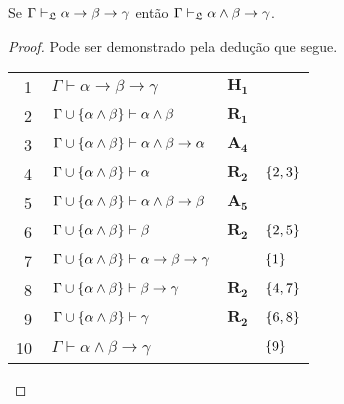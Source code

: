 \vspace{.5\baselineskip}
\begin{tcolorbox}[enhanced jigsaw, breakable, sharp corners, colframe=black, colback=white, boxrule=0.5pt, left=1.5mm, right=1.5mm, top=1.5mm, bottom=1.5mm]
    \begin{lemma}[Importação]\label{importation}
        Se $\Gamma\mathrel{\vdash}_\mathfrak{L}\alpha\to\beta\to\gamma$ então $\Gamma\mathrel{\vdash}_\mathfrak{L}\alpha\wedge\beta\to\gamma$.
        \begin{proof}
        Pode ser demonstrado pela dedução que segue.

        \vspace{0.5\baselineskip}
        \footnotesize
        \setlength{\rowskip}{0.5\baselineskip}
        \begin{xltabular}{\textwidth}{r | X l l}
            \scriptsize{\phantom{0}1}\phantom{ } & $\ \Gamma\vdash\alpha\to\beta\to\gamma$                               & $\mathbf{H_1}$\phantom{1}                & \\[\rowskip]
            \scriptsize{\phantom{0}2}\phantom{ } & $\ \Gamma\cup\set{\alpha\wedge\beta}\vdash\alpha\wedge\beta$          & $\hyperref[modal.rule.1]{\mathbf{R_1}}$  & \\[\rowskip]
            \scriptsize{\phantom{0}3}\phantom{ } & $\ \Gamma\cup\set{\alpha\wedge\beta}\vdash\alpha\wedge\beta\to\alpha$ & $\hyperref[modal.axiom.4]{\mathbf{A_4}}$ & \\[\rowskip]
            \scriptsize{\phantom{0}4}\phantom{ } & $\ \Gamma\cup\set{\alpha\wedge\beta}\vdash\alpha$                     & $\hyperref[modal.rule.2]{\mathbf{R_2}}$  & $\left\{2,3\right\}$\\[\rowskip]
            \scriptsize{\phantom{0}5}\phantom{ } & $\ \Gamma\cup\set{\alpha\wedge\beta}\vdash\alpha\wedge\beta\to\beta$  & $\hyperref[modal.axiom.5]{\mathbf{A_5}}$ & \\[\rowskip]
            \scriptsize{\phantom{0}6}\phantom{ } & $\ \Gamma\cup\set{\alpha\wedge\beta}\vdash\beta$                      & $\hyperref[modal.rule.2]{\mathbf{R_2}}$  & $\left\{2,5\right\}$\\[\rowskip]
            \scriptsize{\phantom{0}7}\phantom{ } & $\ \Gamma\cup\set{\alpha\wedge\beta}\vdash\alpha\to\beta\to\gamma$    &                      & $\left\{1\right\}$\\[\rowskip]
            \scriptsize{\phantom{0}8}\phantom{ } & $\ \Gamma\cup\set{\alpha\wedge\beta}\vdash\beta\to\gamma$             & $\hyperref[modal.rule.2]{\mathbf{R_2}}$  & $\left\{4,7\right\}$\\[\rowskip]
            \scriptsize{\phantom{0}9}\phantom{ } & $\ \Gamma\cup\set{\alpha\wedge\beta}\vdash\gamma$                     & $\hyperref[modal.rule.2]{\mathbf{R_2}}$  & $\left\{6,8\right\}$\\[\rowskip]
            \scriptsize{10}\phantom{ }           & $\ \Gamma\vdash\alpha\wedge\beta\to\gamma$                            &                      & $\left\{9\right\}$
        \end{xltabular}
        \normalsize


\end{proof}
\end{lemma}
\end{tcolorbox}
